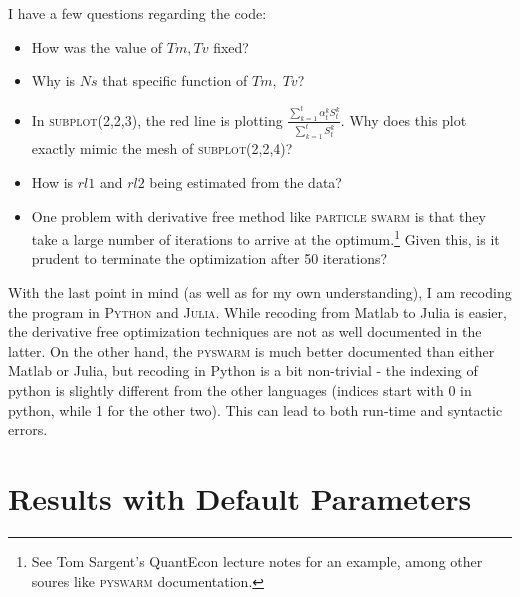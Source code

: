 \documentclass{../cls/NotesV2_Class}
\begin{document}
I have a few questions regarding the code:
\begin{itemize}
	\item How was the value of $Tm, Tv$ fixed?
	\item Why is $Ns$ that specific function of $Tm,\;Tv$?
	\item In \textsc{subplot(2,2,3)}, the red line is plotting $\frac{\sum_{k=1}^t\alpha^k_tS^k_t}{\sum_{k=1}^tS^k_t}$. Why does this plot exactly mimic the mesh of \textsc{subplot(2,2,4)}?
	\item How is $rl1$ and $rl2$ being estimated from the data?
	\item One problem with derivative free method like \textsc{particle swarm} is that they take a large number of iterations to arrive at the optimum.\footnote{See Tom Sargent's QuantEcon lecture notes for an example, among other soures like \textsc{pyswarm} documentation.} Given this, is it prudent to terminate the optimization after 50 iterations?
\end{itemize}

With the last point in mind (as well as for my own understanding), I am recoding the program in \textsc{Python} and \textsc{Julia}. While recoding from Matlab to Julia is easier, the derivative free optimization techniques are not as well documented in the latter. On the other hand, the \textsc{pyswarm} is much better documented than either Matlab or Julia, but recoding in Python is a bit non-trivial - the indexing of python is slightly different from the other languages (indices start with 0 in python, while 1 for the other two). This can lead to both run-time and syntactic errors.

\section{Results with Default Parameters}
\end{document}
